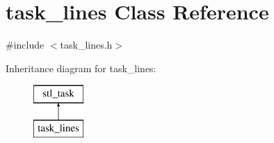 \hypertarget{classtask__lines}{\section{task\-\_\-lines Class Reference}
\label{classtask__lines}
}


{\ttfamily \#include $<$task\-\_\-lines.\-h$>$}

Inheritance diagram for task\-\_\-lines\-:\begin{figure}[H]
\begin{center}
\leavevmode
\includegraphics[height=2.000000cm]{classtask__lines}
\end{center}
\end{figure}
